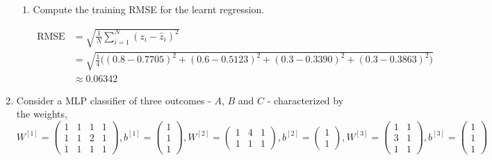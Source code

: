 \documentclass[12pt]{article}
\begin{document}
\begin{enumerate}[leftmargin=\labelsep]
\begin{enumerate}
        \item Compute the training RMSE for the learnt regression.
        
        \begin{equation}
        \begin{split}
            \textrm{RMSE} &= \sqrt{\frac{1}{N}\sum_{i=1}^{N}(z_i-\hat{z}_i)^2} \\
            &= \sqrt{\frac{1}{4}\biggl( (0.8-0.7705)^2 + (0.6-0.5123)^2 + (0.3-0.3390)^2 + (0.3-0.3863)^2\biggr)} \\
            &\approx 0.06342
        \end{split}
        \end{equation}
    \end{enumerate}

    \item Consider a MLP classifier of three outcomes - $A$, $B$ and $C$ - characterized by the weights,
    \begin{equation}
        W^{[1]}=\begin{pmatrix}
            1 & 1 & 1 & 1 \\
            1 & 1 & 2 & 1 \\
            1 & 1 & 1 & 1
        \end{pmatrix}, b^{[1]} = \begin{pmatrix}
            1 \\
            1 \\
            1
        \end{pmatrix}, W^{[2]} = \begin{pmatrix}
            1 & 4 & 1 \\
            1 & 1 & 1
        \end{pmatrix}, b^{[2]} = \begin{pmatrix}
            1 \\
            1
        \end{pmatrix}, W^{[3]} = \begin{pmatrix}
            1 & 1 \\
            3 & 1 \\
            1 & 1
        \end{pmatrix}, b^{[3]} = \begin{pmatrix}
            1 \\
            1 \\
            1
        \end{pmatrix}
    \end{equation}


\end{enumerate}
\end{document}
